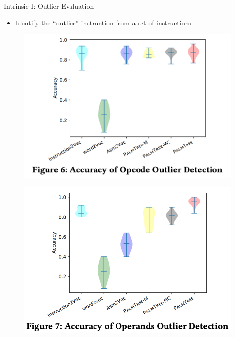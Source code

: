 \documentclass{beamer}
\begin{document}
\begin{frame}{Intrinsic I: Outlier Evaluation}
	
	\begin{itemize}
		\item Identify the ``outlier'' instruction from a set of instructions
	\end{itemize}
	
	\begin{figure}[h]
	\includegraphics[scale=.3]{images/outlier-detection-opcode.png}
	\end{figure}
	
	\begin{figure}[h]
		\includegraphics[scale=.3]{images/outlier-detection-operand.png}
	\end{figure}
	
\end{frame}
\end{document}

